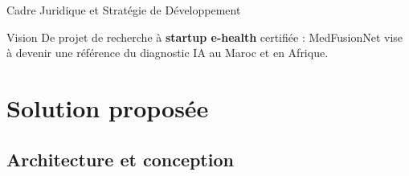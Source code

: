 \documentclass{beamer}
\begin{document}
\begin{frame}[t]{Cadre Juridique et Stratégie de Développement}
\vspace{-0.2em}

\begin{alertblock}{Vision}
De projet de recherche à \textbf{startup e-health} certifiée : MedFusionNet vise à devenir une référence du diagnostic IA au Maroc et en Afrique.
\end{alertblock}

\end{frame}


\section{Solution proposée}
\subsection{Architecture et conception}
\end{document}
